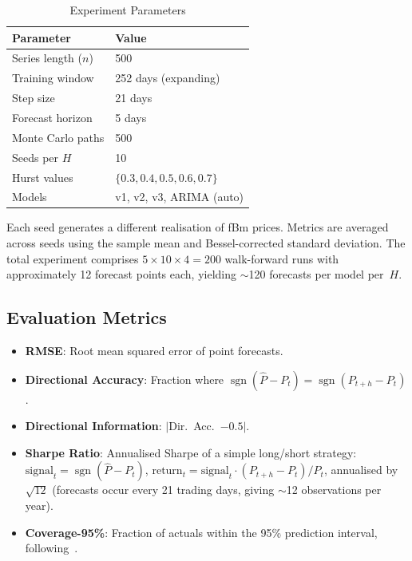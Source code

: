 \documentclass[12pt,a4paper]{article}
\begin{document}
\begin{table}[htbp]
  \centering
  \caption{Experiment Parameters}
  \label{tab:params}
  \begin{tabular}{ll}
    \toprule
    \textbf{Parameter} & \textbf{Value} \\
    \midrule
    Series length ($n$)      & 500 \\
    Training window           & 252 days (expanding) \\
    Step size                 & 21 days \\
    Forecast horizon          & 5 days \\
    Monte Carlo paths         & 500 \\
    Seeds per $H$             & 10 \\
    Hurst values              & $\{0.3, 0.4, 0.5, 0.6, 0.7\}$ \\
    Models                    & v1, v2, v3, ARIMA (auto) \\
    \bottomrule
  \end{tabular}
\end{table}

Each seed generates a different realisation of fBm prices.  Metrics are
averaged across seeds using the sample mean and Bessel-corrected standard
deviation.  The total experiment comprises $5 \times 10 \times 4 = 200$
walk-forward runs with approximately 12 forecast points each, yielding
$\sim$120 forecasts per model per~$H$.

\subsection{Evaluation Metrics}

\begin{itemize}
  \item \textbf{RMSE}: Root mean squared error of point forecasts.
  \item \textbf{Directional Accuracy}: Fraction where
        $\operatorname{sgn}(\hat{P} - P_t)
        = \operatorname{sgn}(P_{t+h} - P_t)$.
  \item \textbf{Directional Information}: $|$Dir.\ Acc.\ $- 0.5|$.
  \item \textbf{Sharpe Ratio}: Annualised Sharpe of a simple long/short
        strategy: $\text{signal}_t = \operatorname{sgn}(\hat{P} - P_t)$,
        $\text{return}_t = \text{signal}_t \cdot (P_{t+h} - P_t) / P_t$,
        annualised by $\sqrt{12}$ (forecasts occur every 21 trading days,
        giving $\sim$12 observations per year).
  \item \textbf{Coverage-95\%}: Fraction of actuals within the 95\%
        prediction interval, following~\citet{GneitingRaftery2007}.
\end{itemize}
\end{document}
